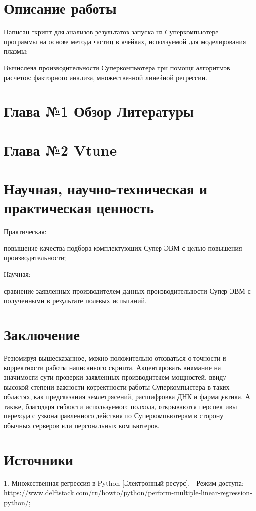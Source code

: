 \documentclass{article}
\begin{document}
\section{Описание работы}
Написан скрипт для анализов результатов запуска на Суперкомпьютере программы на основе метода частиц в ячейках, исползуемой для моделирования плазмы;

Вычислена производительности Суперкомпьютера при помощи алгоритмов расчетов: факторного анализа, множественной линейной регрессии.

\section{Глава №1 Обзор Литературы}

\section{Глава №2 Vtune}

\section{Научная, научно-техническая и практическая ценность}
Практическая:

повышение качества подбора комплектующих Супер-ЭВМ с целью повышения производительности;

Научная:

сравнение заявленных производителем данных производительности Супер-ЭВМ с полученными в результате полевых испытаний.

\section{Заключение}
Резюмируя вышесказанное, можно положительно отозваться о точности и корректности работы написанного скрипта. Акцентировать внимание на значимости сути проверки заявленных производителем мощностей, ввиду высокой степени важности корректности работы Суперкомпьютера в таких областях, как предсказания землетрясений, расшифровка ДНК и фармацевтика. А также, благодаря гибкости используемого подхода, открываются перспективы перехода с узконаправленного действия по Суперкомпьютерам в сторону обычных серверов или персональных компьютеров.




\section{Источники}
1. Множественная регрессия в Python [Электронный ресурс].
   - Режим доступа: https://www.delftstack.com/ru/howto/python/perform-multiple-linear-regression-python/;
\end{document}
